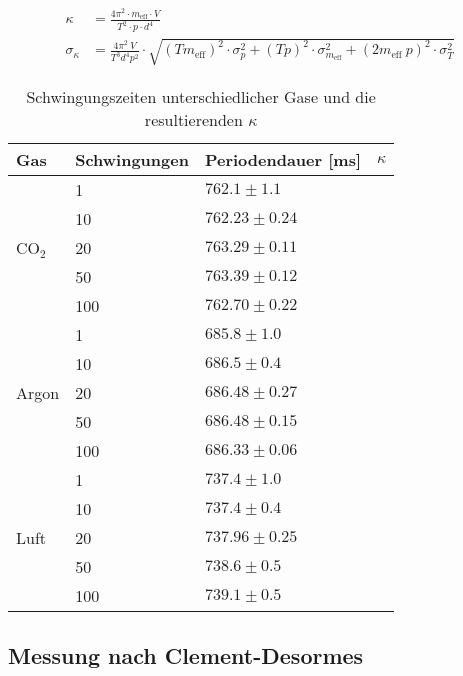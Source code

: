 \documentclass[12pt,a4paper,titlepage,headinclude,bibtotoc]{scrartcl}
\begin{document}
\begin{align*}
	\kappa&=\frac{4\pi^2 \cdot m_{\text{eff}}\cdot V }{T^{2} \cdot p \cdot d^{4}}\\
	\sigma_{\kappa}&=\frac{4\pi^2 ~ V}{T^{3}  d^{4}  p^{2}} \cdot \sqrt{\left(T  m_{\text{eff}}\right)^2 \cdot \sigma_{p}^{2} + \left(T  p\right)^2 \cdot \sigma_{m_{\text{eff}}}^{2} + \left(2m_{\text{eff}}~p\right)^{2} \cdot \sigma_{T}^{2}}
\end{align*}

\begin{table}
	\centering
	\begin{tabular}{|l|l|l|l|}
		\hline
		Gas 	&Schwingungen & Periodendauer [ms] & $\kappa$ \\\hline\hline

			& 1 	& $762.1 \pm 1.1$	& \\%
			& 10 	& $762.23 \pm 0.24$ 	& \\
		CO$_2$	& 20 	& $763.29 \pm 0.11$ 	& \\
			& 50 	& $763.39 \pm 0.12$ 	& \\
			& 100 	& $762.70 \pm 0.22$	& \\\hline
	
			& 1 	& $685.8 \pm 1.0$	& \\
			& 10	& $686.5 \pm 0.4$	& \\
		Argon	& 20	& $686.48 \pm 0.27$	& \\
			& 50	& $686.48 \pm 0.15$	& \\
			& 100	& $686.33 \pm 0.06$	& \\\hline
	
			& 1	& $737.4 \pm 1.0$	& \\
			& 10	& $737.4 \pm 0.4$	& \\
		Luft	& 20	& $737.96 \pm 0.25$	& \\
			& 50	& $738.6 \pm 0.5$	& \\
			& 100	& $739.1 \pm 0.5$	& \\\hline
	\end{tabular}
	\caption{Schwingungszeiten unterschiedlicher Gase und die resultierenden $\kappa$}
	\label{tab:schwingungszeit}
\end{table}



\subsection{Messung nach Clement-Desormes}
\end{document}
